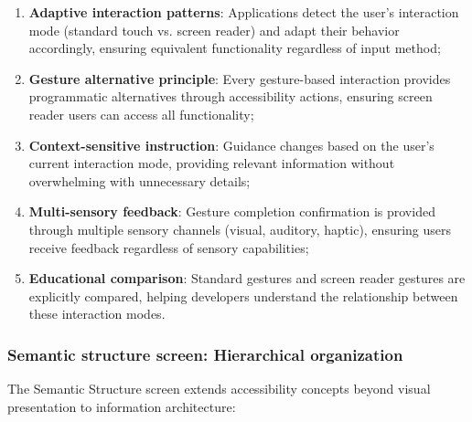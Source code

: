 \begin{enumerate}
    \item \textbf{Adaptive interaction patterns}: Applications detect the user's interaction mode (standard touch vs. screen reader) and adapt their behavior accordingly, ensuring equivalent functionality regardless of input method;
    
    \item \textbf{Gesture alternative principle}: Every gesture-based interaction provides programmatic alternatives through accessibility actions, ensuring screen reader users can access all functionality;
    
    \item \textbf{Context-sensitive instruction}: Guidance changes based on the user's current interaction mode, providing relevant information without overwhelming with unnecessary details;
    
    \item \textbf{Multi-sensory feedback}: Gesture completion confirmation is provided through multiple sensory channels (visual, auditory, haptic), ensuring users receive feedback regardless of sensory capabilities;
    
    \item \textbf{Educational comparison}: Standard gestures and screen reader gestures are explicitly compared, helping developers understand the relationship between these interaction modes.
\end{enumerate}

\subsubsection{Semantic structure screen: Hierarchical organization}

The Semantic Structure screen extends accessibility concepts beyond visual presentation to information architecture:

